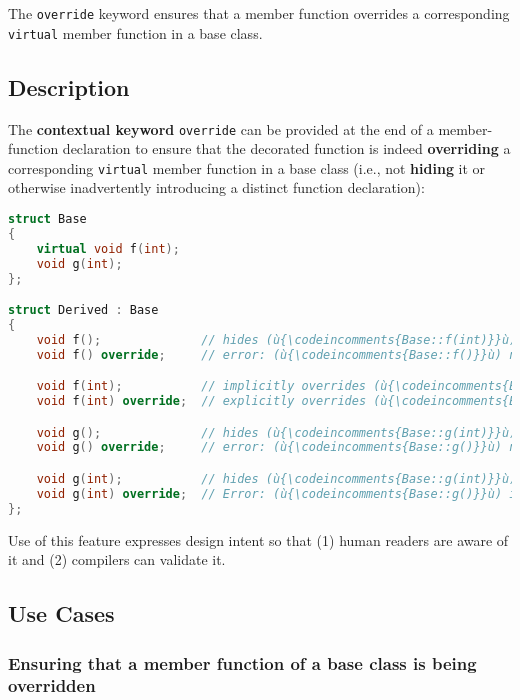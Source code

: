 

The \texttt{override} keyword ensures that a member function overrides a corresponding \texttt{virtual} member function in a base class.

\subsection[Description]{Description}\label{description}

The \textbf{contextual keyword} \texttt{override} can be provided at the
end of a member-function declaration to ensure that the decorated
function is indeed \textbf{overriding} a corresponding \texttt{virtual}
member function in a base class (i.e., not \textbf{hiding} it or
otherwise inadvertently introducing a distinct function declaration):

\begin{lstlisting}[language=C++]
struct Base
{
    virtual void f(int);
    void g(int);
};

struct Derived : Base
{
    void f();              // hides (ù{\codeincomments{Base::f(int)}}ù) (likely mistake)
    void f() override;     // error: (ù{\codeincomments{Base::f()}}ù) not found

    void f(int);           // implicitly overrides (ù{\codeincomments{Base::f(int)}}ù)
    void f(int) override;  // explicitly overrides (ù{\codeincomments{Base::f(int)}}ù)

    void g();              // hides (ù{\codeincomments{Base::g(int)}}ù) (likely mistake)
    void g() override;     // error: (ù{\codeincomments{Base::g()}}ù) not found

    void g(int);           // hides (ù{\codeincomments{Base::g(int)}}ù) (likely mistake)
    void g(int) override;  // Error: (ù{\codeincomments{Base::g()}}ù) is not (ù{\codeincomments{virtual}}ù).
};
\end{lstlisting}
    
\noindent Use of this feature expresses design intent so that (1) human readers
are aware of it and (2) compilers can validate it.

\subsection[Use Cases]{Use Cases}\label{use-cases}

\subsubsection[Ensuring that a member function of a base class is being overridden]{Ensuring that a member function of a base class is being overridden}\label{ensuring-that-a-member-function-of-a-base-class-is-being-overridden}

